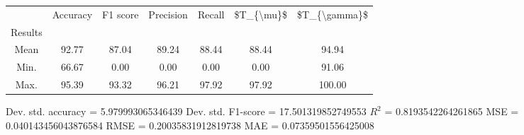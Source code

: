\begin{tabular}{|c|c|c|c|c|c|c|}
\toprule
{} &  Accuracy &  F1 score &  Precision &  Recall &  \$T\_\{\textbackslash mu\}\$ &  \$T\_\{\textbackslash gamma\}\$ \\
Results &           &           &            &         &            &               \\
\hline
Mean    &     92.77 &     87.04 &      89.24 &   88.44 &      88.44 &         94.94 \\
Min.    &     66.67 &      0.00 &       0.00 &    0.00 &       0.00 &         91.06 \\
Max.    &     95.39 &     93.32 &      96.21 &   97.92 &      97.92 &        100.00 \\
\bottomrule
\end{tabular}

 Dev. std. accuracy = 5.979993065346439
 Dev. std. F1-score = 17.501319852749553
 $R^2$ = 0.8193542264261865
 MSE = 0.040143456043876584
 RMSE = 0.20035831912819738
 MAE = 0.07359501556425008